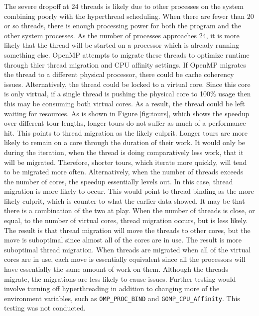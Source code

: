 \documentclass[10pt,letterpaper]{article}
\begin{document}
The severe dropoff at 24 threads is likely due to other processes on the system combining poorly with the hyperthread scheduling. When there are fewer than 20 or so threads, there is enough processing power for both the program and the other system processes. As the number of processes approaches 24, it is more likely that the thread will be started on a processor which is already running something else. OpenMP attempts to migrate these threads to optimize runtime through thier thread migration and CPU affinity settings. If OpenMP migrates the thread to a different physical processor, there could be cache coherency issues. Alternatively, the thread could be locked to a virtual core. Since this core is only virtual, if a single thread is pushing the physical core to 100\% usage then this may be consuming both virtual cores. As a result, the thread could be left waiting for resources. As is shown in Figure \ref{fig:tours}, which shows the speedup over different tour lengths, longer tours do not suffer as much of a performance hit. This points to thread migration as the likely culprit. Longer tours are more likely to remain on a core through the duration of their work. It would only be during the iteration, when the thread is doing comparatively less work, that it will be migrated. Therefore, shorter tours, which iterate more quickly, will tend to be migrated more often. Alternatively, when the number of threads exceeds the number of cores, the speedup essentially levels out. In this case, thread migration is more likely to occur. This would point to thread binding as the more likely culprit, which is counter to what the earlier data showed. It may be that there is a combination of the two at play. When the number of threads is close, or equal, to the number of virtual cores, thread migration occurs, but is less likely. The result is that thread migration will move the threads to other cores, but the move is suboptimal since almost all of the cores are in use. The result is more suboptimal thread migration. When threads are migrated when all of the virtual cores are in use, each move is essentially equivalent since all the processors will have essentially the same amount of work on them. Although the threads migrate, the migrations are less likely to cause issues. Further testing would involve turning off hyperthreading in addition to changing more of the environment variables, such as \texttt{OMP\_PROC\_BIND} and \texttt{GOMP\_CPU\_Affinity}. This testing was not conducted. 
\end{document}
